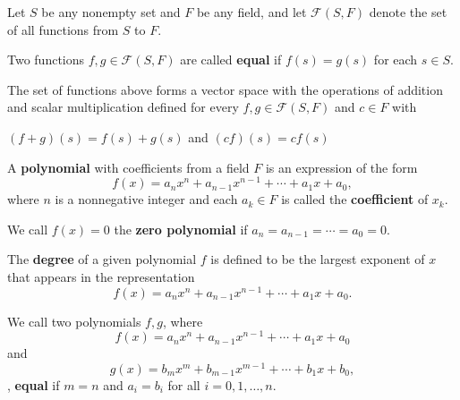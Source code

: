 \begin{definition}
    Let \( S \) be any nonempty set and \( F  \) be any field, and let \( \mathcal{F}(S,F) \) denote the set of all functions from \( S  \) to \( F  \).
\end{definition}

\begin{definition}
    Two functions \( f,g \in \mathcal{F}(S,F)  \) are called \textbf{equal} if \( f(s) = g(s) \) for each \( s \in S  \). 
\end{definition}

The set of functions above forms a vector space with the operations of addition and scalar multiplication defined for every \( f,g \in \mathcal{F}(S,F) \) and \( c \in F  \) with 
\begin{center}
    \( (f+g)(s) = f(s) + g(s)  \) and \( (cf)(s) = cf(s)  \)
\end{center}

\begin{definition}
    A \textbf{polynomial} with coefficients from a field \( F  \) is an expression of the form 
    \[  f(x) = a_{n} x^{n} + a_{n-1} x^{n-1} + \cdots + a_{1} x + a_{0}, \]
    where \( n  \) is a nonnegative integer and each \( a_{k } \in F   \) is called the \textbf{coefficient } of \( x_{k }  \).
\end{definition}

\begin{definition}
    We call \( f(x) = 0  \) the \textbf{zero polynomial} if \( a_{n} = a_{n-1} = \cdots = a_{0} = 0  \).
\end{definition}

\begin{definition}[Degree]
    The \textbf{degree} of a given polynomial \( f  \) is defined to be the largest exponent of \( x  \) that appears in the representation
    \[  f(x) = a_n x^{n} + a_{n-1} x^{n-1} + \cdots + a_{1}x + a_{0}.  \]
\end{definition}

\begin{definition}
    We call two polynomials \( f,g  \), where 
    \[ f(x) = a_n x^{n} +  a_{n-1} x^{n-1} + \cdots + a_{1}x + a_{0}   \] and 
    \[  g(x) = b_m x^{m} + b_{m-1} x^{m-1} + \cdots + b_{1}x + b_{0}, \],
    \textbf{equal} if \( m =n  \) and \( a_{i} = b_{i}  \) for all \( i = 0,1, \dots , n  \).
\end{definition}


